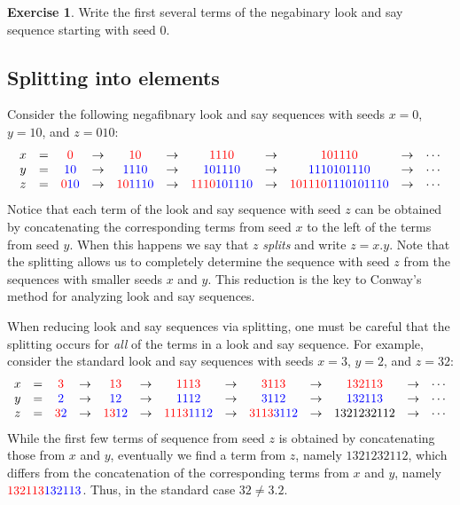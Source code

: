 \documentclass[reqno]{amsart}
\theoremstyle{definition}
\newtheorem{exercise}[theorem]{Exercise}
\newcommand{\red}[1]{{\color{red}{#1}}}
\newcommand{\blue}[1]{{\color{blue}{#1}}}
\begin{document}
\begin{exercise}\label{Exercise: negabinary las with seed 0}
    Write the first several terms of the negabinary look and say sequence starting with seed 0.
\end{exercise}

\subsection{Splitting into elements}\label{subsection: splitting}
Consider the following negafibnary look and say sequences with seeds $x=0$, $y=10$, and $z=010$:
\begin{equation*}
\begin{array}{cccccccccccccc}
x &=& \red{0}   &\to& \red{10}    &\to& \red{1110}    &\to& \red{101110}      &\to& \cdots\\
y &=& \blue{10} &\to& \blue{1110} &\to& \blue{101110} &\to& \blue{1110101110} &\to& \cdots\\
z &=& \red{0}\blue{10} &\to& \red{10}\blue{1110} &\to& \red{1110}\blue{101110} &\to& \red{101110}\blue{1110101110} &\to& \cdots
\end{array}
\end{equation*}
Notice that each term of the look and say sequence with seed $z$ can be obtained by concatenating the corresponding terms from seed $x$ to the left of the terms from seed $y$. When this happens we say that $z$ \emph{splits} and write $z=x.y$. Note that the splitting allows us to completely determine the sequence with seed $z$ from the sequences with smaller seeds $x$ and $y$. This reduction is the key to Conway's method for analyzing look and say sequences. 

When reducing look and say sequences via splitting, one must be careful that the splitting occurs for \emph{all} of the terms in a look and say sequence. For example, consider the standard look and say sequences with seeds $x=3$, $y=2$, and $z=32$:
\begin{equation*}
\begin{array}{cccccccccccccc}
x &=& \red{3}  &\to& \red{13}  &\to& \red{1113}  &\to& \red{3113}   &\to& \red{132113}  &\to& \cdots\\
y &=& \blue{2} &\to& \blue{12} &\to& \blue{1112} &\to& \blue{3112}  &\to& \blue{132113} &\to& \cdots\\
z &=& \red{3}\blue{2} &\to& \red{13}\blue{12} &\to& \red{1113}\blue{1112} &\to& \red{3113}\blue{3112} &\to& 1321232112&\to& \cdots
\end{array}
\end{equation*}
While the first few terms of sequence from seed $z$ is obtained by concatenating those from $x$ and $y$, eventually we find a term from $z$, namely $1321232112$, which differs from the concatenation of the corresponding terms from $x$ and $y$, namely $\red{132113}\blue{132113}$. Thus, in the standard case $32\not=3.2$. 
\end{document}
